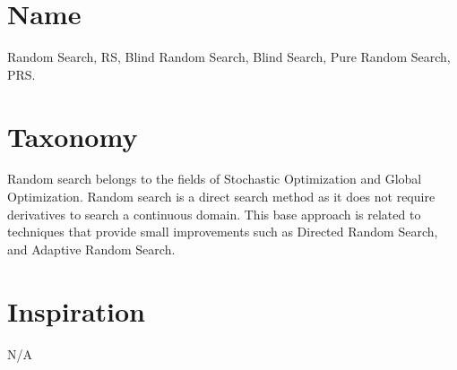\documentclass[a4paper, 11pt]{article}
\begin{document}
\section{Name} 
\label{sec:name}
Random Search, RS, Blind Random Search, Blind Search, Pure Random Search, PRS.

\section{Taxonomy}
\label{sec:taxonomy}
Random search belongs to the fields of Stochastic Optimization and Global Optimization.
Random search is a direct search method as it does not require derivatives to search a continuous domain.
This base approach is related to techniques that provide small improvements such as Directed Random Search, and Adaptive Random Search. 

\section{Inspiration}
\label{sec:inspiration}
N/A
\end{document}
